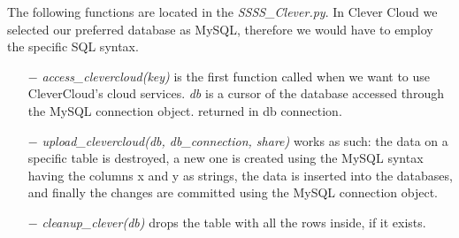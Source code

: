 \documentclass[12pt, a4paper, oneside]{book}
\begin{document}
    The following functions are located in the {\it SSSS\_Clever.py}. In Clever Cloud we selected our preferred database as MySQL, therefore we would have to employ the specific SQL syntax.
    \vspace{-0.5cm}
    \begin{itemize}
        \item[$-$] {\it access\_clevercloud(key)} is the first function called when we want to use CleverCloud's cloud services. {\it db } is a cursor of the database accessed through the MySQL connection object.
returned in db connection.
    \end{itemize}
    \vspace{-0.5cm}
    \begin{itemize}
        \item[$-$] {\it upload\_clevercloud(db, db\_connection, share)} works as such: the data on a specific table is destroyed, a new one is created using the MySQL syntax having the columns x and y as strings, the data is inserted into the databases, and finally the changes are committed using the MySQL connection object.
    \end{itemize}
    \vspace{-0.5cm}
    \begin{itemize}
        \item[$-$] {\it cleanup\_clever(db)} drops the table with all the rows inside, if it exists.
    \end{itemize}
\end{document}
